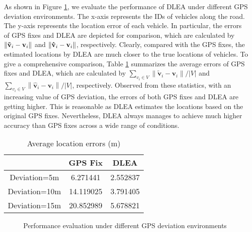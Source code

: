\documentclass[letterpaper, 10 pt, conference]{ieeeconf}
\begin{document}
As shown in Figure \ref{fig:3}, we evaluate the performance of DLEA under different GPS deviation environments. The x-axis represents the IDs of vehicles along the road. The y-axis represents the location error of each vehicle. In particular, the errors of GPS fixes and DLEA are depicted for comparison, which are calculated by $\left\| {{\bf{\tilde v}}_i  - {\bf{v}}_i } \right\|$  and $\left\| {{\bf{\hat v}}_i  - {\bf{v}}_i } \right\|$, respectively. Clearly, compared with the GPS fixes, the estimated locations by DLEA are much closer to the true locations of vehicles. To give a comprehensive comparison,  Table \ref{table:compare} summarizes the average errors of GPS fixes and DLEA, which are calculated by ${\sum\limits_{v_i  \in V} {\left\| {{\mathbf{\tilde v}}_i  - {\mathbf{v}}_i } \right\|} }/{{|V|}}$ and ${\sum\limits_{v_i  \in V} {\left\| {{\mathbf{\hat v}}_i  - {\mathbf{v}}_i } \right\|} }/{{|V|}}$, respectively. Observed from these statistics, with an increasing value of GPS deviation, the errors of both GPS fixes and DLEA are getting higher. This is reasonable as DLEA estimates the locations based on the original GPS fixes.  Nevertheless,  DLEA always manages to achieve much higher accuracy than GPS fixes across a wide range of conditions.
\begin{table}[h]
\renewcommand{\arraystretch}{1.2}
\renewcommand{\tabcolsep}{0.7cm}
\caption{Average location errors (m)}
\label{table:compare}
\centering
\begin{tabular}{|c|c|c|}
\hline
 & GPS Fix & DLEA \\
\hline
Deviation=5m  & 6.271441 & 2.552837  \\
\hline
Deviation=10m  & 14.119025 &  3.791405 \\
\hline
Deviation=15m  & 20.852989 &  5.678821 \\
\hline
\end{tabular}
\end{table}


\begin{figure}[h]
\caption{Performance evaluation under different GPS deviation environments}
\label{fig:3}
\end{figure}
\end{document}

